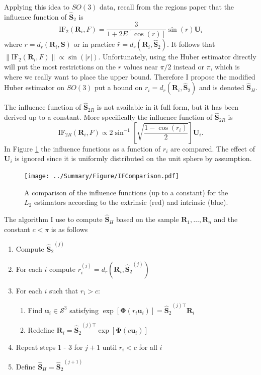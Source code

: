 \documentclass{article}\usepackage[]{graphicx}\usepackage[]{color}
\newcommand{\ProjMean}{{\widehat{\bm S}_{2}}}
\newcommand{\GeomMean}{{\widehat{\bm S}_{2R}}}
\newcommand{\HuberMean}{{\widehat{\bm S}_H}}
\begin{document}
Applying this idea to $SO(3)$ data, recall from the regions paper that the influence function of $\ProjMean$ is
\[
\text{IF}_2(\bm R_i,F)=\frac{3}{1+2E[\cos(r)]}\sin(r)\bm U_i
\]
where $r=d_r(\bm R_i,\bm S)$ or in practice $\hat{r}=d_r(\bm R_i,\ProjMean)$.  It follows that $\|\text{IF}_2(\bm R_i,F)\|\propto \sin(|r|)$.  Unfortunately, using the Huber estimator directly will put the most restrictions on the $r$ values near $\pi/2$ instead or $\pi$, which is where we really want to place the upper bound.  Therefore I propose the modified Huber estimator on $SO(3)$ put a bound on $r_i=d_r(\bm R_i,\ProjMean)$ and is denoted $\HuberMean$.  

The influence function of $\GeomMean$ is not available in it full form, but it has been derived up to a constant.  More specifically the influence function of $\GeomMean$ is
\[
\text{IF}_{2R}(\bm R_i,F)\propto 2\sin^{-1}\left[\sqrt{\frac{1-\cos(r_i)}{2}}\right]\bm U_i.
\]
In Figure \ref{fig:IFs} the influence functions as a function of $r_i$ are compared.  The effect of $\bm U_i$ is ignored since it is uniformly distributed on the unit sphere by assumption.



\begin{figure}
\centering
\texttt{[image: ../Summary/Figure/IFComparison.pdf]}
\caption{A comparison of the influence functions (up to a constant) for the $L_2$ estimators according to the extrinsic (red) and intrinsic (blue).}
\label{fig:IFs}
\end{figure}

The algorithm I use to compute $\HuberMean$ based on the sample $\bm R_1,\dots,\bm R_n$ and the constant $c<\pi$ is as follows
\begin{enumerate} 
\item Compute $\ProjMean^{(j)}$
\item For each $i$ compute $r_i^{(j)}=d_r(\bm R_i,\ProjMean^{(j)})$
\item For each $i$ such that $r_i>c$:
\begin{enumerate}
\item Find $\bm u_i\in\mathcal{S}^3$ satisfying $\exp[\bm{\Phi}(r_i\bm u_i)]=\ProjMean^{(j)\top}\bm R_i$
\item Redefine $\bm R_i=\ProjMean^{(j)\top}\exp[\bm{\Phi}(c\bm u_i)]$
\end{enumerate}
\item Repeat steps 1 - 3 for $j+1$ until $r_i<c$ for all $i$
\item Define $\HuberMean=\ProjMean^{(j+1)}$
\end{enumerate}
\end{document}
